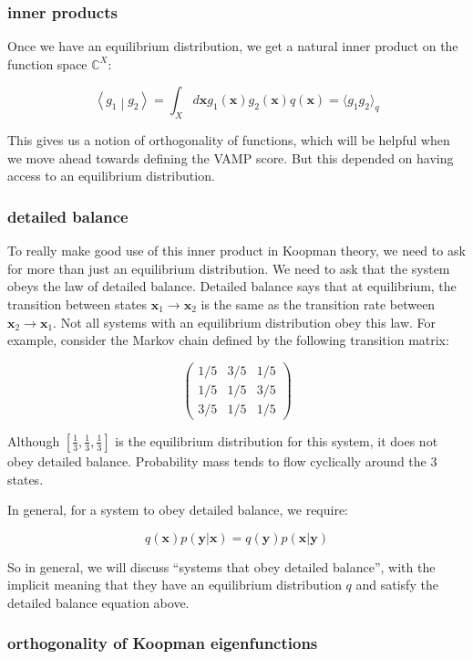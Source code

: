 \documentclass[]{article}
\newcommand{\braket}[2]{\left\langle #1 \middle| #2 \right\rangle}
\newcommand{\w}[1]{\mathbf{#1}}
\newcommand{\CC}{\mathbb{C}}
\begin{document}
\subsubsection{inner products}

Once we have an equilibrium distribution, we get a natural inner product on the function space $\CC^X$:

$$
\braket{g_1}{g_2} = \int_X d\w{x} g_1(\w{x}) g_2(\w{x}) q(\w{x}) = \langle g_1 g_2 \rangle_q
$$

This gives us a notion of orthogonality of functions, which will be helpful when we move ahead towards defining the VAMP score. But this depended on having access to an equilibrium distribution.

\subsubsection{detailed balance}

To really make good use of this inner product in Koopman theory, we need to ask for more than just an equilibrium distribution. We need to ask that the system obeys the law of detailed balance. Detailed balance says that at equilibrium, the transition between states $\w{x}_1\to \w{x}_2$ is the same as the transition rate between $\w{x}_2\to \w{x}_1$. Not all systems with an equilibrium distribution obey this law. For example, consider the Markov chain defined by the following transition matrix:

$$
\begin{pmatrix}
	1/5 & 3/5 & 1/5 \\
	1/5 & 1/5 & 3/5 \\
	3/5 & 1/5 & 1/5
\end{pmatrix}
$$

Although $[\frac{1}{3},\frac{1}{3},\frac{1}{3}]$ is the equilibrium distribution for this system, it does not obey detailed balance. Probability mass tends to flow cyclically around the 3 states.

In general, for a system to obey detailed balance, we require:

$$
q(\w{x})p(\w{y}|\w{x}) = q(\w{y})p(\w{x}|\w{y})
$$

So in general, we will discuss ``systems that obey detailed balance'', with the implicit meaning that they have an equilibrium distribution $q$ and satisfy the detailed balance equation above.

\subsubsection{orthogonality of Koopman eigenfunctions}
\end{document}
